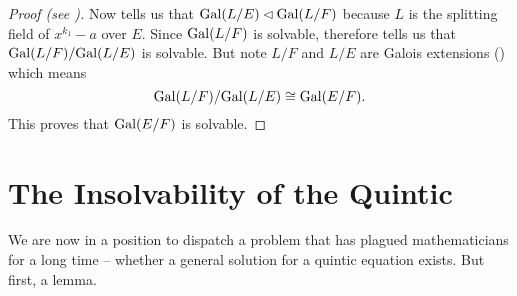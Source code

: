 \begin{proof}[Proof (see {\cite[Theorem 32.5]{gallian_2016}})]
    Now  tells us that $\mathrm{Gal}(L/E) \lhd \mathrm{Gal}(L/F)$ because $L$ is the splitting field of $x^{k_1} - a$ over $E$. Since $\mathrm{Gal}(L/F)$ is solvable, therefore  tells us that $\mathrm{Gal}(L/F)/\mathrm{Gal}(L/E)$ is solvable. But note $L/F$ and $L/E$ are Galois extensions () which means
    \[
        \mathrm{Gal}(L/F)/\mathrm{Gal}(L/E) \cong \mathrm{Gal}(E/F).
    \]
    This proves that $\mathrm{Gal}(E/F)$ is solvable.
\end{proof}


\section{The Insolvability of the Quintic}
We are now in a position to dispatch a problem that has plagued mathematicians for a long time -- whether a general solution for a quintic equation exists. But first, a lemma.


